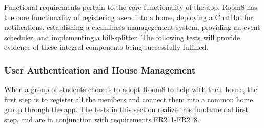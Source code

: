 \documentclass[12pt, titlepage]{article}
\begin{document}
Functional requirements pertain to the core functionality of the app. Room8 has the core functionality of registering users into a home, deploying a ChatBot for notifications, establishing a cleanliness managegement system, providing an event scheduler, and implementing a bill-splitter. The following tests will provide evidence of these integral components being successfully fulfilled.

\subsubsection{User Authentication and House Management}
When a group of students chooses to adopt Room8 to help with their house, the first step is to register all the members and connect them into a common home group through the app. The tests in this section realize this fundamental first step, and are in conjunction with requirements FR211-FR218.
\end{document}

